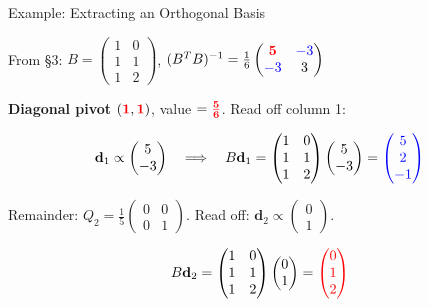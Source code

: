 \documentclass[10pt]{beamer}
\theoremstyle{definition}
\newcommand{\x}[1]{\alert{\textbf{#1}}}
\newcommand{\pvt}[1]{{\color{red}\mathbf{#1}}}       %
\newcommand{\crs}[1]{{\color{blue}#1}}                %
\newcommand{\rd}[1]{{\color{red}#1}}                  %
\newcommand{\bl}[1]{{\color{blue}#1}}                 %
\begin{document}
\begin{frame}{Example: Extracting an Orthogonal Basis}

From \S3: $B = \begin{pmatrix} 1 & 0 \\ 1 & 1 \\ 1 & 2 \end{pmatrix}$, \quad $(B^TB)^{-1} = \frac{1}{6}\begin{pmatrix} \pvt{5} & \crs{-3} \\ \crs{-3} & 3 \end{pmatrix}$

\vspace{0.3em}

\x{Diagonal pivot $(\pvt{1},\pvt{1})$}, value $= \pvt{\frac{5}{6}}$. Read off column 1:

$$\mathbf{d}_1 \propto \begin{pmatrix} 5 \\ -3 \end{pmatrix} \quad\Longrightarrow\quad B\mathbf{d}_1 = \begin{pmatrix} 1 & 0 \\ 1 & 1 \\ 1 & 2 \end{pmatrix}\begin{pmatrix} 5 \\ -3 \end{pmatrix} = \bl{\begin{pmatrix} 5 \\ 2 \\ -1 \end{pmatrix}}$$

\vspace{0.3em}

Remainder: $Q_2 = \frac{1}{5}\begin{pmatrix} 0 & 0 \\ 0 & 1 \end{pmatrix}$. Read off: $\mathbf{d}_2 \propto \begin{pmatrix} 0 \\ 1 \end{pmatrix}$.

$$B\mathbf{d}_2 = \begin{pmatrix} 1 & 0 \\ 1 & 1 \\ 1 & 2 \end{pmatrix}\begin{pmatrix} 0 \\ 1 \end{pmatrix} = \rd{\begin{pmatrix} 0 \\ 1 \\ 2 \end{pmatrix}}$$

\end{frame}
\end{document}
